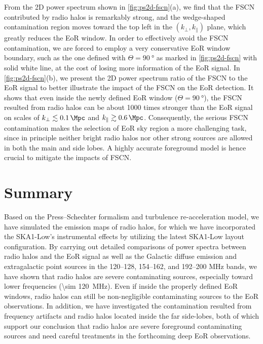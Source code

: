 \documentclass[twocolumn]{aastex62}
\newcommand{\klos}{\text{$k_{\parallel}$}}
\newcommand{\kperp}{\text{$k_{\bot}$}}
\begin{document}
From the 2D power spectrum shown in \autoref{fig:ps2d-fscn}(a),
we find that the FSCN contributed by radio halos is remarkably strong,
and the wedge-shaped contamination region moves toward the top left in
the $(\kperp, \klos)$ plane, which greatly reduces the EoR window.
In order to effectively avoid the FSCN contamination, we are forced to
employ a very conservative EoR window boundary, such as the one defined
with $\Theta = \SI{90}{\degree}$ as marked in \autoref{fig:ps2d-fscn}
with solid white line, at the cost of losing more information of the EoR
signal.
In \autoref{fig:ps2d-fscn}(b), we present the 2D power spectrum ratio
of the FSCN to the EoR signal to better illustrate the impact of the
FSCN on the EoR detection.
It shows that even inside the newly defined EoR window
($\Theta = \SI{90}{\degree}$), the FSCN resulted from radio halos can
be about 1000 times stronger than the EoR signal on scales of
$\kperp \lesssim \SI{0.1}{\per\Mpc}$ and $\klos \gtrsim \SI{0.6}{\per\Mpc}$.
Consequently,
the serious FSCN contamination makes the selection of EoR sky region
a more challenging task, since in principle neither bright radio halos
nor other strong sources are allowed in both the main and side lobes.
A highly accurate foreground model is hence crucial to mitigate the
impacts of FSCN.


\section{Summary}
\label{sec:summary}

Based on the Press--Schechter formalism and turbulence re-acceleration
model, we have simulated the emission maps of radio halos, for which we
have incorporated the SKA1-Low's instrumental effects by utilizing the
latest SKA1-Low layout configuration.
By carrying out detailed comparisons of power spectra between radio halos
and the EoR signal as well as the Galactic diffuse emission and
extragalactic point sources in the \numrange{120}{128},
\numrange{154}{162}, and \numrange{192}{200} \si{\MHz} bands,
we have shown that radio halos are severe contaminating sources,
especially toward lower frequencies (\SI{\sim 120}{\MHz}).
Even if inside the properly defined EoR windows, radio halos can still
be non-negligible contaminating sources to the EoR observations.
In addition, we have investigated the contamination resulted from
frequency artifacts and radio halos located inside the far side-lobes,
both of which support our conclusion that radio halos are severe
foreground contaminating sources and need careful treatments in the
forthcoming deep EoR observations.
\end{document}
